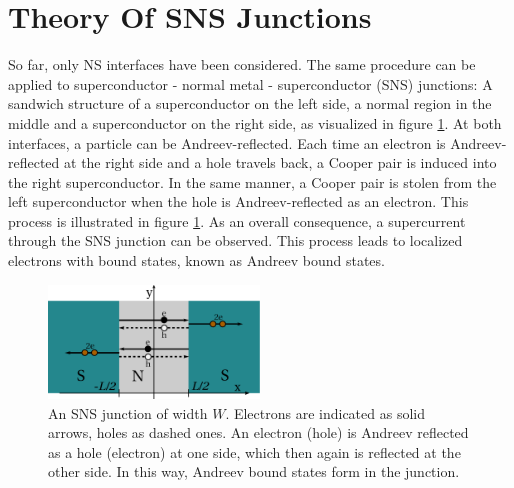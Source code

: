 \section{Theory Of SNS Junctions}\label{sec:theory-sns}
So far, only NS interfaces have been considered. The same procedure can be applied to superconductor - normal metal - superconductor (SNS) junctions: A sandwich structure of a superconductor on the left side, a normal region in the middle and a superconductor on the right side, as visualized in figure \ref{fig:sns-junction}. At both interfaces, a particle can be Andreev-reflected.
Each time an electron is Andreev-reflected at the right side and a hole travels back, a Cooper pair is induced into the right superconductor. In the same manner, a Cooper pair is stolen from the left superconductor when the hole is Andreev-reflected as an electron. This process is illustrated in figure \ref{fig:sns-junction}. As an overall consequence, a supercurrent through the SNS junction can be observed. This process leads to localized electrons with bound states, known as Andreev bound states.
\begin{figure}
\centering
\includegraphics[width=0.5\textwidth]{figure/framework-analytical/sns_csch}
\caption{An SNS junction of width $W$. Electrons are indicated as solid arrows, holes as dashed ones. An electron (hole) is Andreev reflected as a hole (electron) at one side, which then again is reflected at the other side. In this way, Andreev bound states form in the junction.}\label{fig:sns-junction}
\end{figure}


